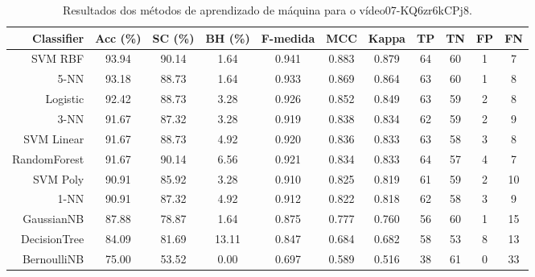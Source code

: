 \begin{table}[!htb]
\centering
\caption{Resultados dos métodos de aprendizado de máquina para o vídeo07-KQ6zr6kCPj8.}
\label{tab:07-KQ6zr6kCPj8}
\begin{tabular}{r|c|c|c|c|c|c|c|c|c|c}
\hline\hline
Classifier & Acc (\%) & SC (\%) & BH (\%) & F-medida & MCC & Kappa & TP & TN & FP & FN \\ \hline
SVM RBF & 93.94 & 90.14 & 1.64 & 0.941 & 0.883 & 0.879 & 64 & 60 & 1 & 7 \\ 
5-NN & 93.18 & 88.73 & 1.64 & 0.933 & 0.869 & 0.864 & 63 & 60 & 1 & 8 \\ 
Logistic & 92.42 & 88.73 & 3.28 & 0.926 & 0.852 & 0.849 & 63 & 59 & 2 & 8 \\ 
3-NN & 91.67 & 87.32 & 3.28 & 0.919 & 0.838 & 0.834 & 62 & 59 & 2 & 9 \\ 
SVM Linear & 91.67 & 88.73 & 4.92 & 0.920 & 0.836 & 0.833 & 63 & 58 & 3 & 8 \\ 
RandomForest & 91.67 & 90.14 & 6.56 & 0.921 & 0.834 & 0.833 & 64 & 57 & 4 & 7 \\ 
SVM Poly & 90.91 & 85.92 & 3.28 & 0.910 & 0.825 & 0.819 & 61 & 59 & 2 & 10 \\ 
1-NN & 90.91 & 87.32 & 4.92 & 0.912 & 0.822 & 0.818 & 62 & 58 & 3 & 9 \\ 
GaussianNB & 87.88 & 78.87 & 1.64 & 0.875 & 0.777 & 0.760 & 56 & 60 & 1 & 15 \\ 
DecisionTree & 84.09 & 81.69 & 13.11 & 0.847 & 0.684 & 0.682 & 58 & 53 & 8 & 13 \\ 
BernoulliNB & 75.00 & 53.52 & 0.00 & 0.697 & 0.589 & 0.516 & 38 & 61 & 0 & 33 \\ 
\hline\hline
\end{tabular}
\end{table}
